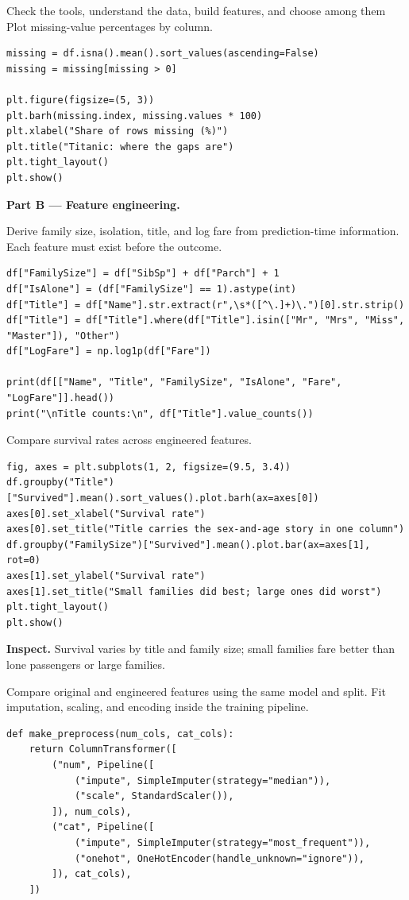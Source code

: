 \begin{labproject}{Check the tools, understand the data, build features, and choose among them}
Plot missing-value percentages by column.

\begin{lstlisting}[style=utppython]
missing = df.isna().mean().sort_values(ascending=False)
missing = missing[missing > 0]

plt.figure(figsize=(5, 3))
plt.barh(missing.index, missing.values * 100)
plt.xlabel("Share of rows missing (%)")
plt.title("Titanic: where the gaps are")
plt.tight_layout()
plt.show()
\end{lstlisting}

\medskip\noindent\textbf{Part B --- Feature engineering.}\par

Derive family size, isolation, title, and log fare from prediction-time information. Each feature must exist before the outcome.

\begin{lstlisting}[style=utppython]
df["FamilySize"] = df["SibSp"] + df["Parch"] + 1
df["IsAlone"] = (df["FamilySize"] == 1).astype(int)
df["Title"] = df["Name"].str.extract(r",\s*([^\.]+)\.")[0].str.strip()
df["Title"] = df["Title"].where(df["Title"].isin(["Mr", "Mrs", "Miss", "Master"]), "Other")
df["LogFare"] = np.log1p(df["Fare"])

print(df[["Name", "Title", "FamilySize", "IsAlone", "Fare", "LogFare"]].head())
print("\nTitle counts:\n", df["Title"].value_counts())
\end{lstlisting}

Compare survival rates across engineered features.

\begin{lstlisting}[style=utppython]
fig, axes = plt.subplots(1, 2, figsize=(9.5, 3.4))
df.groupby("Title")["Survived"].mean().sort_values().plot.barh(ax=axes[0])
axes[0].set_xlabel("Survival rate")
axes[0].set_title("Title carries the sex-and-age story in one column")
df.groupby("FamilySize")["Survived"].mean().plot.bar(ax=axes[1], rot=0)
axes[1].set_ylabel("Survival rate")
axes[1].set_title("Small families did best; large ones did worst")
plt.tight_layout()
plt.show()
\end{lstlisting}

\textbf{Inspect.} Survival varies by title and family size; small families fare better than lone passengers or large families.

Compare original and engineered features using the same model and split. Fit imputation, scaling, and encoding inside the training pipeline.

\begin{lstlisting}[style=utppython]
def make_preprocess(num_cols, cat_cols):
    return ColumnTransformer([
        ("num", Pipeline([
            ("impute", SimpleImputer(strategy="median")),
            ("scale", StandardScaler()),
        ]), num_cols),
        ("cat", Pipeline([
            ("impute", SimpleImputer(strategy="most_frequent")),
            ("onehot", OneHotEncoder(handle_unknown="ignore")),
        ]), cat_cols),
    ])


\end{lstlisting}
\end{labproject}
